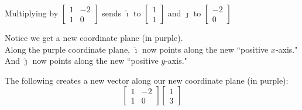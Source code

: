 \documentclass{article}
\begin{document}
Multiplying by $
\begin{bmatrix}
    1 & -2 \\ 
    1 & 0 
\end{bmatrix}$
sends $\hat{\imath}$ to 
$\begin{bmatrix} 
    1 \\ 1 
\end{bmatrix}$
and $\hat{\jmath}$ to 
$\begin{bmatrix}
    -2 \\ 0
\end{bmatrix}$
\bigskip 

\begin{center}
\end{center}
\bigskip 

Notice we get a new coordinate plane (in purple). \newline\\

Along the purple coordinate plane, {\color{red}$\hat\imath$} now points along the new ``positive $x$-axis." 
\newline\\

And {\color{blue}$\hat\jmath$} now points along the new ``positive $y$-axis."
\bigskip 

\begin{center}
\end{center}

\newpage 

The following creates a new vector along our new coordinate plane (in purple):
\[
\begin{bmatrix}
    1 & -2 \\
    1 & 0 
\end{bmatrix}
\begin{bmatrix}
    1 \\ 3
\end{bmatrix}
\]
\end{document}
